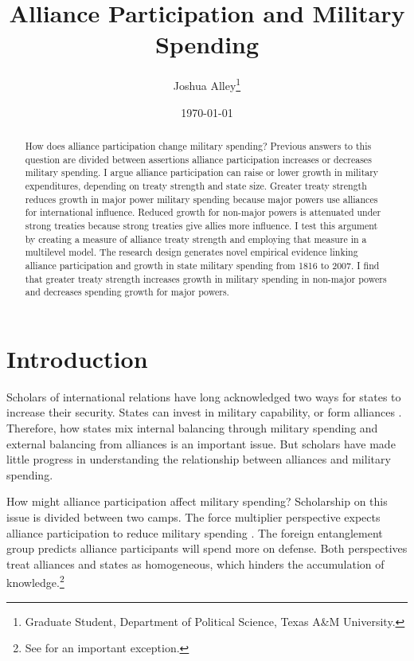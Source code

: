 \documentclass[12pt]{article}
\title{\textbf{Alliance Participation and Military Spending}}
\author{Joshua Alley\footnote{Graduate Student,
Department of Political Science, Texas A\&M University.}}
\date{{\normalsize \today}}
\begin{document}
\maketitle 

\newpage 

\doublespace 

\begin{abstract}
How does alliance participation change military spending? 
Previous answers to this question are divided between assertions alliance participation increases or decreases military spending. 
I argue alliance participation can raise or lower growth in military expenditures, depending on treaty strength and state size. 
Greater treaty strength reduces growth in major power military spending because major powers use alliances for international influence. 
Reduced growth for non-major powers is attenuated under strong treaties because strong treaties give allies more influence. 
I test this argument by creating a measure of alliance treaty strength and employing that measure in a multilevel model. 
The research design generates novel empirical evidence linking alliance participation and growth in state military spending from 1816 to 2007. 
I find that greater treaty strength increases growth in military spending in non-major powers and decreases spending growth for major powers.  
\end{abstract}



\section{Introduction}


Scholars of international relations have long acknowledged two ways for states to increase their security. 
States can invest in military capability, or form alliances \citep{Morgenthau1948}.
Therefore, how states mix internal balancing through military spending and external balancing from alliances is an important issue. 
But scholars have made little progress in understanding the relationship between alliances and military spending. 


How might alliance participation affect military spending? 
Scholarship on this issue is divided between two camps. 
The force multiplier perspective expects alliance participation to reduce military spending \citep{Morrow1993, Conybeare1994, DigiuseppePoast2016}. 
The foreign entanglement group predicts alliance participants will spend more on defense. 
Both perspectives treat alliances and states as homogeneous, which hinders the accumulation of knowledge.\footnote{See \citet{DigiuseppePoast2016} for an important exception.} 
\end{document}
